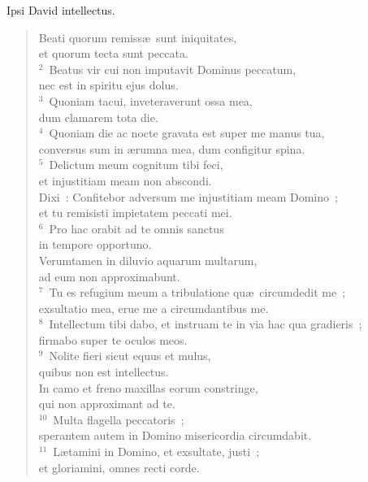 \lettrine[lines=3,image=true,loversize=0.05,lraise=-0.03]{I}{}psi David intellectus. \begin{flushleft}\begin{verse}\vspace{6pt}Beati quorum remiss\ae\ sunt iniquitates,\\ et quorum tecta sunt peccata.\\
${}^{2}$~Beatus vir cui non imputavit Dominus peccatum,\\ nec est in spiritu ejus dolus.\\
${}^{3}$~Quoniam tacui, inveteraverunt ossa mea,\\ dum clamarem tota die.\\
${}^{4}$~Quoniam die ac nocte gravata est super me manus tua,\\ conversus sum in \ae rumna mea, dum configitur spina.\\
${}^{5}$~Delictum meum cognitum tibi feci,\\ et injustitiam meam non abscondi.\\ Dixi~: Confitebor adversum me injustitiam meam Domino~;\\ et tu remisisti impietatem peccati mei.\\
${}^{6}$~Pro hac orabit ad te omnis sanctus\\ in tempore opportuno.\\ Verumtamen in diluvio aquarum multarum,\\ ad eum non approximabunt.\\
${}^{7}$~Tu es refugium meum a tribulatione qu\ae\ circumdedit me~;\\ exsultatio mea, erue me a circumdantibus me.\\
${}^{8}$~Intellectum tibi dabo, et instruam te in via hac qua gradieris~;\\ firmabo super te oculos meos.\\
${}^{9}$~Nolite fieri sicut equus et mulus,\\ quibus non est intellectus.\\ In camo et freno maxillas eorum constringe,\\ qui non approximant ad te.\\
${}^{10}$~Multa flagella peccatoris~;\\ sperantem autem in Domino misericordia circumdabit.\\
${}^{11}$~L\ae tamini in Domino, et exsultate, justi~;\\ et gloriamini, omnes recti corde.\end{verse}\end{flushleft}



